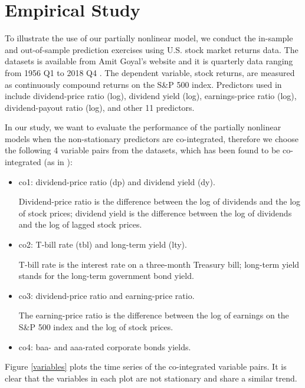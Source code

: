 \documentclass[a4paper,12pt,times,numbered,print,index]{report}
\numberwithin{equation}{section}
\begin{document}
\section{Empirical Study}
To illustrate the use of our partially nonlinear model, we conduct the in-sample and out-of-sample prediction exercises using U.S. stock market returns data.
The datasets is available from Amit Goyal's website and it is quarterly data ranging from 1956 Q1 to 2018 Q4 . 
The dependent variable, stock returns, are measured as continuously compound returns on the S\&P 500 index. 
Predictors used in \cite{welch2008comprehensive} include dividend-price ratio (log), dividend yield (log), earnings-price ratio (log), dividend-payout ratio (log), and other 11 predictors. 

In our study, we want to evaluate the performance of the partially nonlinear models when the non-stationary predictors are co-integrated, therefore we choose the following 4 variable pairs from the \cite{welch2008comprehensive} datasets, which has been found to be co-integrated (as in \cite{zhou2018semiparametric}): 
\begin{itemize}
	\item co1: dividend-price ratio (dp) and dividend yield (dy). 
	
	Dividend-price ratio is the difference between the log of dividends and the log of stock prices; dividend yield is the difference between the log of dividends and the log of lagged stock prices.
	
	\item co2: T-bill rate (tbl) and long-term yield (lty).
	
	T-bill rate is the interest rate on a three-month Treasury bill; long-term yield stands for the long-term government bond yield.
	
	\item co3: dividend-price ratio and earning-price ratio.
	
	The earning-price ratio is the difference between the log of earnings on the S\&P 500 index and the log of stock prices.
	
	\item co4: baa- and aaa-rated corporate bonds yields. 
\end{itemize}

Figure \ref{variables} plots the time series of the co-integrated variable pairs. It is clear that the variables in each plot are not stationary and share a similar trend.
\end{document}
